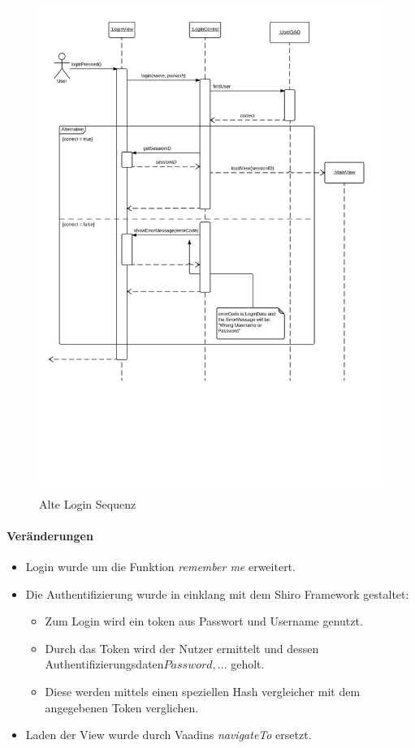     \begin{figure}
      \centering
        \includegraphics[width=\linewidth]{Login-Sequenz.pdf}
       \caption{Alte Login Sequenz}
    \end{figure}

    \paragraph{Veränderungen}
        \begin{itemize}
            \item Login wurde um die Funktion \emph{remember me} erweitert.
            \item Die Authentifizierung wurde in einklang mit dem Shiro Framework gestaltet:
            \begin{itemize}
                \item Zum Login wird ein token aus Passwort und Username genutzt.
                \item Durch das Token wird der Nutzer ermittelt und dessen Authentifizierungsdaten\(Password, ...\) geholt.
                \item Diese werden mittels einen speziellen Hash vergleicher mit dem angegebenen Token verglichen.
            \end{itemize}
            \item Laden der View wurde durch Vaadins \emph{navigateTo} ersetzt.
        \end{itemize}

